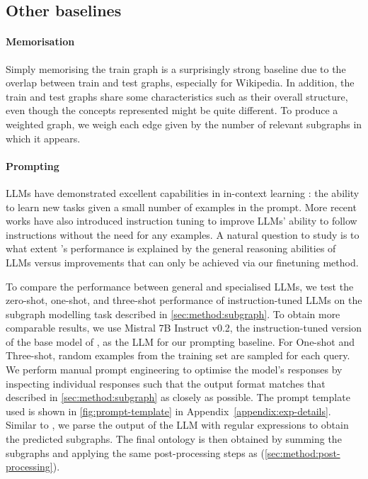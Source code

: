\subsection{Other baselines}

\paragraph{Memorisation}
Simply memorising the train graph is a surprisingly strong baseline due to the overlap between train and test graphs, especially for Wikipedia. In addition, the train and test graphs share some characteristics such as their overall structure, even though the concepts represented might be quite different. To produce a weighted graph, we weigh each edge given by the number of relevant subgraphs in which it appears.

\paragraph{Prompting}

LLMs have demonstrated excellent capabilities in in-context learning \cite{brown2020language}: the ability to learn new tasks given a small number of examples in the prompt. More recent works have also introduced instruction tuning \cite{ouyang2022training,rafailov2024direct} to improve LLMs' ability to follow instructions without the need for any examples. A natural question to study is to what extent \name's performance is explained by the general reasoning abilities of LLMs versus improvements that can only be achieved via our finetuning method.

To compare the performance between general and specialised LLMs, we test the zero-shot, one-shot, and three-shot performance of instruction-tuned LLMs on the subgraph modelling task described in \cref{sec:method:subgraph}. To obtain more comparable results, we use Mistral 7B Instruct v0.2, the instruction-tuned version of the base model of \name, as the LLM for our prompting baseline. For One-shot and Three-shot, random examples from the training set are sampled for each query. We perform manual prompt engineering to optimise the model's responses by inspecting individual responses such that the output format matches that described in \cref{sec:method:subgraph} as closely as possible. The prompt template used is shown in \cref{fig:prompt-template} in Appendix~\ref{appendix:exp-details}. Similar to \name, we parse the output of the LLM with regular expressions to obtain the predicted subgraphs. The final ontology is then obtained by summing the subgraphs and applying the same post-processing steps as \name (\cref{sec:method:post-processing}).
